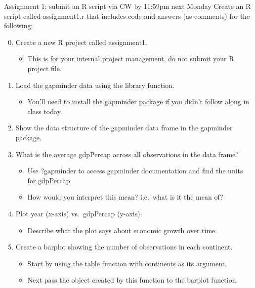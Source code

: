 \documentclass[
  8pt,
  ignorenonframetext,
  dvipsnames]{beamer}
\providecommand{\tightlist}{%
  \setlength{\itemsep}{0pt}\setlength{\parskip}{0pt}}
\let\olditem\item
\renewcommand{\item}{%
  \olditem\vspace{4pt}
}
\begin{document}
\begin{frame}{Assignment 1: submit an R script via CW by 11:59pm next
Monday}
\protect\hypertarget{assignment-1-submit-an-r-script-via-cw-by-1159pm-next-monday}{}
Create an R script called assignment1.r that includes code and answers
(as comments) for the following:

\begin{enumerate}
\setcounter{enumi}{-1}
\tightlist
\item
  Create a new R project called assignment1.

  \begin{itemize}
  \tightlist
  \item
    This is for your internal project management, do not submit your R
    project file.
  \end{itemize}
\item
  Load the gapminder data using the library function.

  \begin{itemize}
  \tightlist
  \item
    You'll need to install the gapminder package if you didn't follow
    along in class today.
  \end{itemize}
\item
  Show the data structure of the gapminder data frame in the gapminder
  package.
\item
  What is the average gdpPercap across all observations in the data
  frame?

  \begin{itemize}
  \tightlist
  \item
    Use ?gapminder to access gapminder documentation and find the units
    for gdpPercap.
  \item
    How would you interpret this mean? i.e.~what is it the mean of?
  \end{itemize}
\item
  Plot year (x-axis) vs.~gdpPercap (y-axis).

  \begin{itemize}
  \tightlist
  \item
    Describe what the plot says about economic growth over time.
  \end{itemize}
\item
  Create a barplot showing the number of observations in each continent.

  \begin{itemize}
  \tightlist
  \item
    Start by using the table function with continents as its argument.
  \item
    Next pass the object created by this function to the barplot
    function.
  \end{itemize}
\end{enumerate}
\end{frame}
\end{document}
